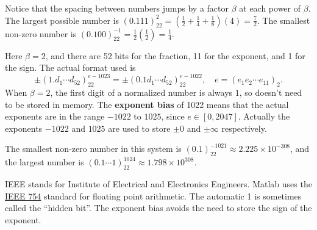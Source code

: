\documentclass[
  letterpaper,
  DIV=11,
  numbers=noendperiod]{scrreprt}
\begin{document}
\begin{tcolorbox}[enhanced jigsaw, bottomrule=.15mm, colbacktitle=quarto-callout-note-color!10!white, breakable, arc=.35mm, coltitle=black, colback=white, bottomtitle=1mm, opacityback=0, title=\textcolor{quarto-callout-note-color}{\faInfo}\hspace{0.5em}{Note}, titlerule=0mm, toptitle=1mm, opacitybacktitle=0.6, colframe=quarto-callout-note-color-frame, leftrule=.75mm, rightrule=.15mm, left=2mm, toprule=.15mm]

Notice that the spacing between numbers jumps by a factor \(\beta\) at
each power of \(\beta\). The largest possible number is
\((0.111)_22^2 = (\tfrac12 + \tfrac14 + \tfrac18)(4) = \tfrac72\). The
smallest non-zero number is
\((0.100)_22^{-1}=\tfrac12(\tfrac12) = \tfrac14\).

\end{tcolorbox}

Here \(\beta=2\), and there are 52 bits for the fraction, 11 for the
exponent, and 1 for the sign. The actual format used is \[
\pm (1.d_1\cdots d_{52})_22^{e-1023} = \pm (0.1d_1\cdots d_{52})_22^{e-1022}, \quad e = (e_1e_2\cdots e_{11})_2.
\] When \(\beta=2\), the first digit of a normalized number is always
\(1\), so doesn't need to be stored in memory. The \textbf{exponent
bias} of 1022 means that the actual exponents are in the range \(-1022\)
to \(1025\), since \(e\in[0,2047]\). Actually the exponents \(-1022\)
and \(1025\) are used to store \(\pm 0\) and \(\pm\infty\) respectively.

The smallest non-zero number in this system is
\((0.1)_22^{-1021} \approx 2.225\times 10^{-308}\), and the largest
number is \((0.1\cdots 1)_22^{1024} \approx 1.798\times 10^{308}\).

\begin{tcolorbox}[enhanced jigsaw, bottomrule=.15mm, colbacktitle=quarto-callout-note-color!10!white, breakable, arc=.35mm, coltitle=black, colback=white, bottomtitle=1mm, opacityback=0, title=\textcolor{quarto-callout-note-color}{\faInfo}\hspace{0.5em}{Note}, titlerule=0mm, toptitle=1mm, opacitybacktitle=0.6, colframe=quarto-callout-note-color-frame, leftrule=.75mm, rightrule=.15mm, left=2mm, toprule=.15mm]

IEEE stands for Institute of Electrical and Electronics Engineers.
Matlab uses the \href{https://en.wikipedia.org/wiki/IEEE_754}{IEEE 754}
standard for floating point arithmetic. The automatic 1 is sometimes
called the ``hidden bit''. The exponent bias avoids the need to store
the sign of the exponent.

\end{tcolorbox}
\end{document}
